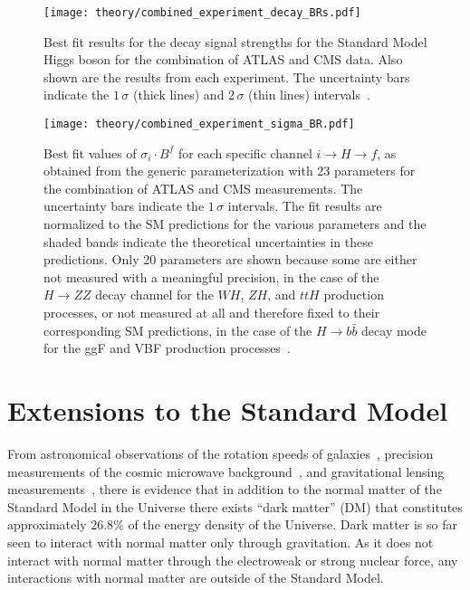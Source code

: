 \begin{figure}[htbp]
 \centering
 \texttt{[image: theory/combined\_experiment\_decay\_BRs.pdf]}
 \caption[Best fit results for the decay signal strengths for the Standard Model Higgs boson for the combination of ATLAS and CMS data.]{%
  Best fit results for the decay signal strengths for the Standard Model Higgs boson for the combination of ATLAS and CMS data.
  Also shown are the results from each experiment.
  The uncertainty bars indicate the $1\,\sigma$ (thick lines) and $2\,\sigma$ (thin lines) intervals~\cite{Pieri:2016szr}.}
 \label{fig:combined_experiment_decay_BRs}
\end{figure}

\begin{figure}[htbp]
 \centering
 \texttt{[image: theory/combined\_experiment\_sigma\_BR.pdf]}
 \caption[Best fit values of $\sigma_{i} \cdot B^{f}$ for each specific channel $i \to H \to f$, as obtained from the generic parameterization with 23 parameters for the combination of ATLAS and CMS measurements.]{%
  Best fit values of $\sigma_{i} \cdot B^{f}$ for each specific channel $i \to H \to f$, as obtained from the generic parameterization with 23 parameters for the combination of ATLAS and CMS measurements.
  The uncertainty bars indicate the $1\,\sigma$ intervals.
  The fit results are normalized to the SM predictions for the various parameters and the shaded bands indicate the theoretical uncertainties in these predictions.
  Only 20 parameters are shown because some are either not measured with a meaningful precision, in the case of the $H \to ZZ$ decay channel for the $WH$, $ZH$, and
  $ttH$ production processes, or not measured at all and therefore fixed to their corresponding SM predictions, in the case of the $H \to b\bar{b}$ decay mode for the ggF and VBF production processes~\cite{Pieri:2016szr}.}
 \label{fig:combined_experiment_sigma_BR}
\end{figure}

\clearpage
\section{Extensions to the Standard Model}

From astronomical observations of the rotation speeds of galaxies~\cite{Rubin:1970zza,Begeman:1991iy}, precision measurements of the cosmic microwave background~\cite{2013ApJS:darkmatter,Akrami:2018vks}, and gravitational lensing measurements~\cite{Trimble:10.1146,Bertone:2004pz,Feng:2010gw}, there is evidence that in addition to the normal matter of the Standard Model in the Universe there exists ``dark matter'' (DM) that constitutes approximately $26.8\%$ of the energy density of the Universe.
Dark matter is so far seen to interact with normal matter only through gravitation.
As it does not interact with normal matter through the electroweak or strong nuclear force, any interactions with normal matter are outside of the Standard Model.

